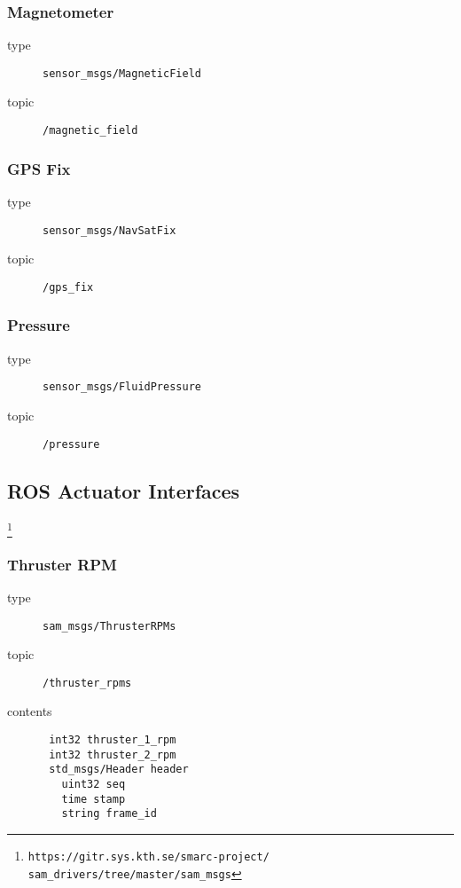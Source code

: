 \documentclass[9pt,technote]{IEEEtran} %
\begin{document}
\subsubsection{Magnetometer}

\begin{description}
\item[type] \texttt{sensor\_msgs/MagneticField}
\item[topic] \texttt{/magnetic\_field}
\end{description}

\subsubsection{GPS Fix} 

\begin{description}
\item[type] \texttt{sensor\_msgs/NavSatFix}
\item[topic] \texttt{/gps\_fix}
\end{description}

\subsubsection{Pressure} 

\begin{description}
\item[type] \texttt{sensor\_msgs/FluidPressure}
\item[topic] \texttt{/pressure}
\end{description}

\subsection{ROS Actuator Interfaces}

\footnote{\texttt{https://gitr.sys.kth.se/smarc-project/\\sam\_drivers/tree/master/sam\_msgs}}

\subsubsection{Thruster RPM}

\begin{description}
\item[type] \texttt{sam\_msgs/ThrusterRPMs}
\item[topic] \texttt{/thruster\_rpms}
\item[contents] \begin{scriptsize}
\begin{verbatim}
 int32 thruster_1_rpm
 int32 thruster_2_rpm
 std_msgs/Header header
   uint32 seq
   time stamp
   string frame_id
\end{verbatim}
\end{scriptsize}
\end{description}
\end{document}
